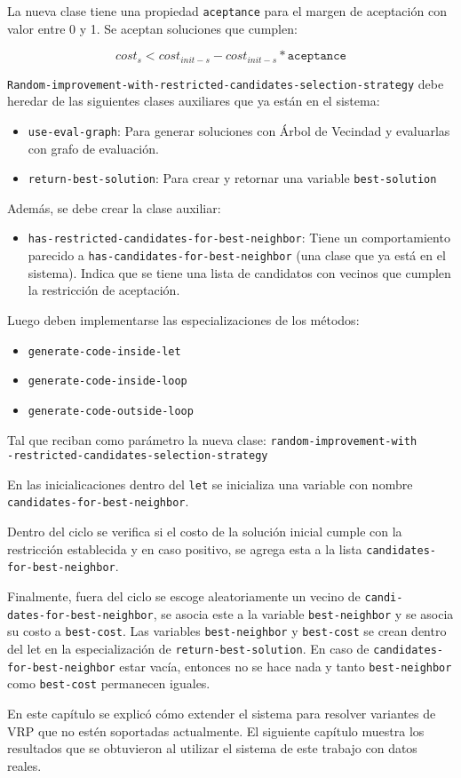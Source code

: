 La nueva clase tiene una propiedad \texttt{aceptance} para el margen de aceptación con valor entre 0 y 1. Se aceptan soluciones que cumplen:

$$
cost_s < cost_{init-s} - cost_{init-s} * \texttt{aceptance} 
$$

\texttt{Random-improvement-with-restricted-candidates-selection-strategy} debe heredar de las siguientes clases auxiliares que ya están en el sistema:

\begin{itemize}
	\item \texttt{use-eval-graph}: Para generar soluciones con Árbol de Vecindad y evaluarlas con grafo de evaluación.
	\item \texttt{return-best-solution}: Para crear y retornar una variable \texttt{best-solution}
\end{itemize}

Además, se debe crear la clase auxiliar:

\begin{itemize}
	\item \texttt{has-restricted-candidates-for-best-neighbor}: Tiene un comportamiento parecido a \texttt{has-candidates-for-best-neighbor} (una clase que ya está en el sistema). Indica que se tiene una lista de candidatos con vecinos que cumplen la restricción de aceptación.
\end{itemize}

Luego deben implementarse las especializaciones de los métodos:
\begin{itemize}
	\item \texttt{generate-code-inside-let}
	\item \texttt{generate-code-inside-loop}
	\item \texttt{generate-code-outside-loop}
\end{itemize}
Tal que reciban como parámetro la nueva clase: \texttt{random-improvement-with\\-restricted-candidates-selection-strategy}

En las inicialicaciones dentro del \texttt{let} se inicializa una variable con nombre \texttt{candidates-for-best-neighbor}.

Dentro del ciclo se verifica si el costo de la solución inicial cumple con la restricción establecida y en caso positivo, se agrega esta a la lista \texttt{candidates-\\for-best-neighbor}.

Finalmente, fuera del ciclo se escoge aleatoriamente un vecino de \texttt{candi-\\dates-for-best-neighbor}, se asocia este a la variable \texttt{best-neighbor} y se asocia su costo a \texttt{best-cost}. Las variables \texttt{best-neighbor} y \texttt{best-cost} se crean dentro del let en la especialización de \texttt{return-best-solution}. En caso de \texttt{candidates-for-best-neighbor} estar vacía, entonces no se hace nada y tanto \texttt{best-neighbor} como \texttt{best-cost} permanecen iguales.

En este capítulo se explicó cómo extender el sistema para resolver variantes de VRP que no estén soportadas actualmente. El siguiente capítulo muestra los resultados que se obtuvieron al utilizar el sistema de este trabajo con datos reales.


